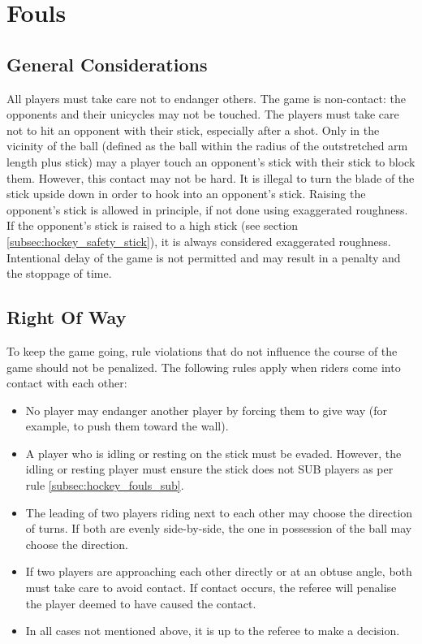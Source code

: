 \section{Fouls}

\subsection{General Considerations}
All players must take care not to endanger others.
The game is non-contact: the opponents and their unicycles may not be touched.
The players must take care not to hit an opponent with their stick, especially after a shot.
Only in the vicinity of the ball (defined as the ball within the radius of the outstretched arm length plus stick) may a player touch an opponent's stick with their stick to block them.
However, this contact may not be hard.
It is illegal to turn the blade of the stick upside down in order to hook into an opponent's stick.
Raising the opponent's stick is allowed in principle, if not done using exaggerated roughness.
If the opponent's stick is raised to a high stick (see section \ref{subsec:hockey_safety_stick}), it is always considered exaggerated roughness.
Intentional delay of the game is not permitted and may result in a penalty and the stoppage of time.

\subsection{Right Of Way}
To keep the game going, rule violations that do not influence the course of the game should not be penalized.
The following rules apply when riders come into contact with each other:
\begin{itemize}
\item No player may endanger another player by forcing them to give way (for example, to push them toward the wall).
\item A player who is idling or resting on the stick must be evaded.
  However, the idling or resting player must ensure the stick does not SUB players as per rule \ref{subsec:hockey_fouls_sub}.
\item The leading of two players riding next to each other may choose the direction of turns.
If both are evenly side-by-side, the one in possession of the ball may choose the direction.
\item If two players are approaching each other directly or at an obtuse angle, both must take care to avoid contact.
  If contact occurs, the referee will penalise the player deemed to have caused the contact.
\item In all cases not mentioned above, it is up to the referee to make a decision.
\end{itemize}

